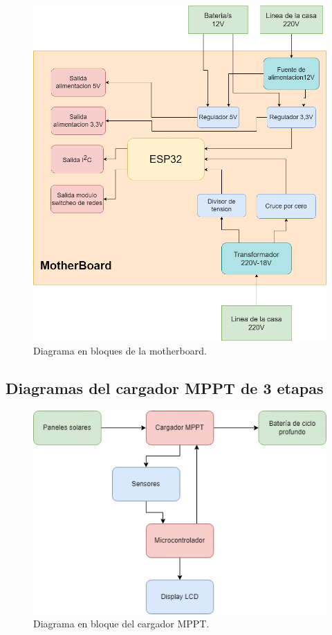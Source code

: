 \begin{figure}[H]
    \centering
    \includegraphics[width=1\linewidth]{analisis-tecnico/Diagrama en bloques mother.png}
    \caption{Diagrama en bloques de la motherboard.}
    \label{fig:diagrama en bloque mother}
\end{figure}

\subsection{Diagramas del cargador MPPT de 3 etapas}

\begin{figure}[H]
    \centering
    \includegraphics[width=1\linewidth]{analisis-tecnico/Diagrama en bloque MPPT.jpg}
    \caption{Diagrama en bloque del cargador MPPT.}
    \label{fig:diagrama bloque mppt}
\end{figure}

